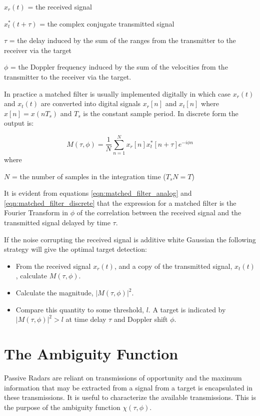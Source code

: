 \documentclass[a4paper]{report}
\numberwithin{equation}{chapter}
\begin{document}
$x_r(t)$ = the received signal

$x_t^*(t + \tau)$ = the complex conjugate transmitted signal

$\tau$ = the delay induced by the sum of the ranges from the transmitter to the receiver via the target

$\phi$ = the Doppler frequency induced by the sum of the velocities from the transmitter to the receiver via the target.

\bigskip

In practice a matched filter is usually implemented digitally in which case $x_r(t)$ and $x_t(t)$ are converted into digital signals $x_r[n]$ and $x_t[n]$ where $x[n] = x(nT_s)$ and $T_s$ is the constant sample period. In discrete form the output is:

\begin{equation}
M(\tau, \phi) = \frac{1}{N} \sum_{n=1}^{N} x_r[n] x_t^*[n + \tau]e^{-i\phi n}
\label{eqn:matched_filter_discrete}
\end{equation}
where

$N$ = the number of samples in the integration time ($T_sN = T$)

\bigskip

It is evident from equations \ref{eqn:matched_filter_analog} and \ref{eqn:matched_filter_discrete} that the expression for a matched filter is the Fourier Transform in $\phi$ of the correlation between the received signal and the transmitted signal delayed by time $\tau$.

\bigskip

If the noise corrupting the received signal is additive white Gaussian the following strategy will give the optimal target detection:

\begin{itemize}
\item{From the received signal $x_r(t)$, and a copy of the transmitted signal, $x_t(t)$, calculate $M(\tau, \phi)$.}
\item{Calculate the magnitude, $|M(\tau, \phi)|^2$.}
\item{Compare this quantity to some threshold, $l$. A target is indicated by $|M(\tau, \phi)|^2 > l$ at time delay $\tau$ and Doppler shift $\phi$.}
\end{itemize}

\section[The Ambiguity Function]{The Ambiguity Function}
Passive Radars are reliant on transmissions of opportunity and the maximum information that may be extracted from a signal from a target is encapsulated in these transmissions. It is useful to characterize the available transmissions. This is the purpose of the ambiguity function $\chi(\tau, \phi)$.
\end{document}
